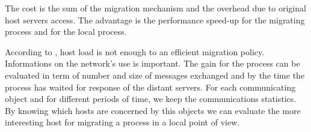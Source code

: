 The cost is the sum of the migration mechanism and the overhead due to original host servers access.
The advantage is the performance speed-up for the migrating process and for the local process. 

According to \cite {dejan93}, host load is not enough to an efficient migration policy. Informations on the network's 
use is important. The gain for the process can be evaluated in term of number and size of messages exchanged and by the
time the process has waited for response of the distant servers. 
For each communicating object and for different periods of time, we keep the communications statistics.
By knowing which hosts are concerned by this objects we can evaluate the more interesting host for
migrating a process in a local point of view. 

